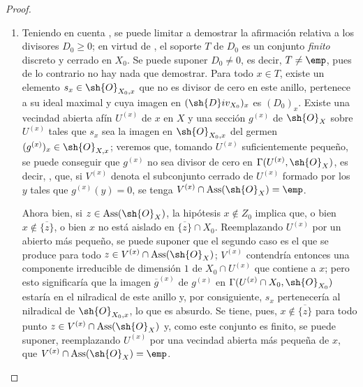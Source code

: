 \begin{proof}
\begin{enumerate}[label=(\roman*)]
  \item Teniendo en cuenta , se puede limitar a demostrar la afirmación relativa a los divisores $D_0\geq0$;
en virtud de , el soporte $T$ de $D_0$ es un conjunto \emph{finito} discreto y cerrado en $X_0$.
Se puede suponer $D_0\neq0$, es decir, $T\neq\emp$, pues de lo contrario no hay nada que demostrar.
Para todo $x\in T$, existe un elemento $s_x\in\sh{O}_{X_0,x}$ que no es divisor de cero en este anillo, pertenece a su ideal maximal y cuya imagen en $(\sh{D}iv_{X_0})_x$ es $(D_0)_x$.
Existe una vecindad abierta afín $U^{(x)}$ de $x$ en $X$ y una sección $g^{(x)}$ de $\sh{O}_X$ sobre $U^{(x)}$ tales que $s_x$ sea la imagen en $\sh{O}_{X_0,x}$ del germen $(g^{(x)})_x\in\sh{O}_{X,x}$;
veremos que, tomando $U^{(x)}$ suficientemente pequeño, se puede conseguir que $g^{(x)}$ no sea divisor de cero en $\Gamma(U^{(x)},\sh{O}_X)$, es decir, , que, si $V^{(x)}$ denota el subconjunto cerrado de $U^{(x)}$ formado por los $y$ tales que $g^{(x)}(y)=0$, se tenga $V^{(x)}\cap\operatorname{Ass}(\sh{O}_X)=\emp$.

Ahora bien, si $z\in\operatorname{Ass}(\sh{O}_X)$, la hipótesis $x\notin Z_0$ implica que, o bien $x\notin\overline{\{z\}}$, o bien $x$ no está aislado en $\overline{\{z\}}\cap X_0$.
Reemplazando $U^{(x)}$ por un abierto más pequeño, se puede suponer que el segundo caso es el que se produce para todo $z\in V^{(x)}\cap\operatorname{Ass}(\sh{O}_X)$;
$V^{(x)}$ contendría entonces una componente irreducible de dimensión $1$ de $X_0\cap U^{(x)}$ que contiene a $x$;
pero esto significaría que la imagen $\overline{g}^{(x)}$ de $g^{(x)}$ en $\Gamma(U^{(x)}\cap X_0,\sh{O}_{X_0})$ estaría en el nilradical de este anillo y, por consiguiente, $s_x$ pertenecería al nilradical de $\sh{O}_{X_0,x}$, lo que es absurdo.
Se tiene, pues, $x\notin\overline{\{z\}}$ para todo punto $z\in V^{(x)}\cap\operatorname{Ass}(\sh{O}_X)$ y, como este conjunto es finito, se puede suponer, reemplazando $U^{(x)}$ por una vecindad abierta más pequeña de $x$, que $V^{(x)}\cap\operatorname{Ass}(\sh{O}_X)=\emp$.


\end{enumerate}
\end{proof}
